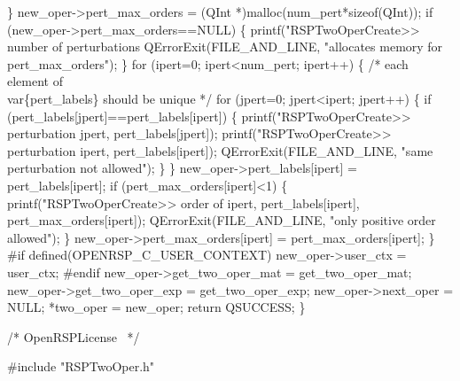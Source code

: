     \}
    new_oper->pert_max_orders = (QInt *)malloc(num_pert*sizeof(QInt));
    if (new_oper->pert_max_orders==NULL) \{
        printf("RSPTwoOperCreate>> number of perturbations %
        QErrorExit(FILE_AND_LINE, "allocates memory for pert_max_orders");
    \}
    for (ipert=0; ipert<num_pert; ipert++) \{
        /* each element of \\var\{pert_labels\} should be unique */
        for (jpert=0; jpert<ipert; jpert++) \{
            if (pert_labels[jpert]==pert_labels[ipert]) \{
                printf("RSPTwoOperCreate>> perturbation %
                       jpert,
                       pert_labels[jpert]);
                printf("RSPTwoOperCreate>> perturbation %
                       ipert,
                       pert_labels[ipert]);
                QErrorExit(FILE_AND_LINE, "same perturbation not allowed");
            \}
        \}
        new_oper->pert_labels[ipert] = pert_labels[ipert];
        if (pert_max_orders[ipert]<1) \{
            printf("RSPTwoOperCreate>> order of %
                   ipert,
                   pert_labels[ipert],
                   pert_max_orders[ipert]);
            QErrorExit(FILE_AND_LINE, "only positive order allowed");
        \}
        new_oper->pert_max_orders[ipert] = pert_max_orders[ipert];
    \}
#if defined(OPENRSP_C_USER_CONTEXT)
    new_oper->user_ctx = user_ctx;
#endif
    new_oper->get_two_oper_mat = get_two_oper_mat;
    new_oper->get_two_oper_exp = get_two_oper_exp;
    new_oper->next_oper = NULL;
    *two_oper = new_oper;
    return QSUCCESS;
\}

\nwendcode{}\endmoddef
/*
  \LA{}OpenRSPLicense~{\nwtagstyle{}}\RA{}
*/

#include "RSPTwoOper.h"

